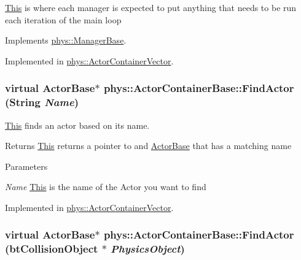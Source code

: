 \hyperlink{structThis}{This} is where each manager is expected to put anything that needs to be run each iteration of the main loop 

Implements \hyperlink{classphys_1_1ManagerBase_aa9e13a3f7c398b708f0f242610b5abf7}{phys::ManagerBase}.



Implemented in \hyperlink{classphys_1_1ActorContainerVector_a883e59ac1674421bac143088a6cf07c8}{phys::ActorContainerVector}.

\hypertarget{classphys_1_1ActorContainerBase_a91223cbaebb8e5f11a4f971d7e5b64b6}{
\subsubsection[{FindActor}]{\setlength{\rightskip}{0pt plus 5cm}virtual {\bf ActorBase}$\ast$ phys::ActorContainerBase::FindActor ({\bf String} {\em Name})}}
\label{d1/d00/classphys_1_1ActorContainerBase_a91223cbaebb8e5f11a4f971d7e5b64b6}


\hyperlink{structThis}{This} finds an actor based on its name. 

\begin{DoxyReturn}{Returns}
\hyperlink{structThis}{This} returns a pointer to and \hyperlink{classphys_1_1ActorBase}{ActorBase} that has a matching name 
\end{DoxyReturn}

\begin{DoxyParams}{Parameters}
\item[{\em Name}]\hyperlink{structThis}{This} is the name of the Actor you want to find \end{DoxyParams}


Implemented in \hyperlink{classphys_1_1ActorContainerVector_ae04f8c6dd9b07ef9c1456707be9e155b}{phys::ActorContainerVector}.

\hypertarget{classphys_1_1ActorContainerBase_a9ba6e38e0f12ada968cfee72fe5144d4}{
\subsubsection[{FindActor}]{\setlength{\rightskip}{0pt plus 5cm}virtual {\bf ActorBase}$\ast$ phys::ActorContainerBase::FindActor (btCollisionObject $\ast$ {\em PhysicsObject})}}
\label{d1/d00/classphys_1_1ActorContainerBase_a9ba6e38e0f12ada968cfee72fe5144d4}


